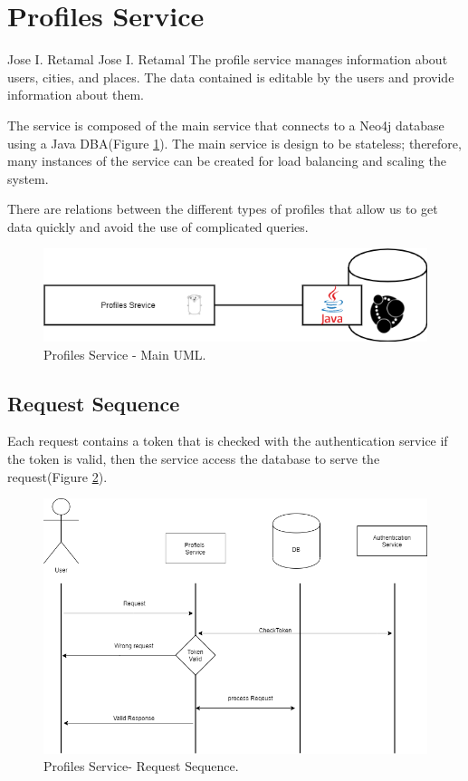 \section{Profiles Service}{Jose I. Retamal }
Jose I. Retamal
\vskip 0.1in
\indent
\indent
The profile service manages information about users, cities, and places. The data contained is editable by the users and provide information about them. 

The service is composed of the main service that connects to a Neo4j database using a Java DBA(Figure \ref{profiles:profilesmaindiagram}). The main service is design to be stateless; therefore, many instances of the service can be created for load balancing and scaling the system. 

There are relations between the different types of profiles that allow us to get data quickly and avoid the use of complicated queries.

\begin{figure}[H]
	\begin{center}
		\includegraphics[width=120mm,scale=1]{img/profiles/profile-main-diagram.png}
		\caption{Profiles Service - Main UML.}
		\label{profiles:profilesmaindiagram}
	\end{center}
	
\end{figure}

\subsection{Request Sequence}

Each request contains a token that is checked with the authentication service if the token is valid, then the service access the database to serve the request(Figure \ref{profiles:reqeustsequence}).

\begin{figure}
	\begin{center}
		\includegraphics[width=120mm,scale=1]{img/profiles/profile-request-sequence.png}
		\caption{Profiles Service- Request Sequence.}
		\label{profiles:reqeustsequence}
	\end{center}
\end{figure}

